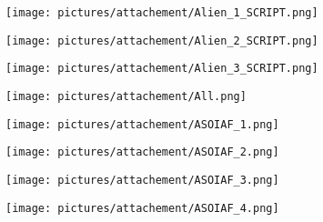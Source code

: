 \begin{figure} 
        \centering
        \begin{subfigure}{.49\textwidth}
                \centering
                \texttt{[image: pictures/attachement/Alien\_1\_SCRIPT.png]}
        \end{subfigure}
        \begin{subfigure}{.49\textwidth}
                \centering
                \texttt{[image: pictures/attachement/Alien\_2\_SCRIPT.png]}
        \end{subfigure}
\end{figure}
\begin{figure} \ContinuedFloat
        \centering
        \begin{subfigure}{.49\textwidth}
                \centering
                \texttt{[image: pictures/attachement/Alien\_3\_SCRIPT.png]}
        \end{subfigure}
        \begin{subfigure}{.49\textwidth}
                \centering
                \texttt{[image: pictures/attachement/All.png]}
        \end{subfigure}
\end{figure}
\begin{figure} \ContinuedFloat
        \centering
        \begin{subfigure}{.49\textwidth}
                \centering
                \texttt{[image: pictures/attachement/ASOIAF\_1.png]}
        \end{subfigure}
        \begin{subfigure}{.49\textwidth}
                \centering
                \texttt{[image: pictures/attachement/ASOIAF\_2.png]}
        \end{subfigure}
\end{figure}
\begin{figure} \ContinuedFloat
        \centering
        \begin{subfigure}{.49\textwidth}
                \centering
                \texttt{[image: pictures/attachement/ASOIAF\_3.png]}
        \end{subfigure}
        \begin{subfigure}{.49\textwidth}
                \centering
                \texttt{[image: pictures/attachement/ASOIAF\_4.png]}
        \end{subfigure}
\end{figure}

